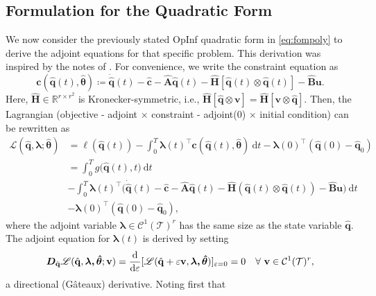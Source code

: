 \subsection*{Formulation for the Quadratic Form}

We now consider the previously stated OpInf quadratic form in \eqref{eq:fompoly} to derive the adjoint equations for that specific problem. This derivation was inspired by the notes of \cite{mcquarrie2024bayesian}. For convenience, we write the constraint equation as\\ 
$$\boldsymbol{c}(\hat{\mathbf{q}}(t),\hat{\bm{\theta}}) \coloneqq \dot{\hat{\mathbf{q}}}(t) - \hat{\mathbf{c}} - \hat{\mathbf{A}}\hat{\mathbf{q}}(t) - \hat{\mathbf{H}}[\hat{\mathbf{q}}(t)\otimes \hat{\mathbf{q}}(t)] - \hat{\mathbf{B}}\mathbf{u}.$$
Here, $\hat{\mathbf{H}}\in \mathbb{R}^{r\times r^2}$ is Kronecker-symmetric, i.e., $\hat{\mathbf{H}}[\hat{\mathbf{q}}\otimes \mathbf{v}] = \hat{\mathbf{H}}[\mathbf{v}\otimes \hat{\mathbf{q}}]$. Then, the Lagrangian (objective - adjoint $\times$ constraint - adjoint(0) $\times$ initial condition) can be rewritten as\\
\begin{align*}
    \mathscr{L}(\hat{\mathbf{q}}, \bm{\lambda}; \hat{\bm{\theta}}) &= \ell(\hat{\mathbf{q}}(t)) - \int_0^T \bm{\lambda}(t)^{\top}\boldsymbol{c}(\hat{\mathbf{q}}(t),\hat{\bm{\theta}})~\mathrm{d}t - \bm{\lambda}(0)^{\top}(\hat{\mathbf{q}}(0)-\hat{\mathbf{q}}_0)\\
    &= \int_0^T g\bigl(\hat{\mathbf{q}}(t),t \bigl)~\mathrm{d}t \\
    &- \int_0^T \bm{\lambda}(t)^{\top}\bigl(\dot{\hat{\mathbf{q}}}(t) - \hat{\mathbf{c}} - \hat{\mathbf{A}}\hat{\mathbf{q}}(t) - \hat{\mathbf{H}}(\hat{\mathbf{q}}(t)\otimes \hat{\mathbf{q}}(t)) - \hat{\mathbf{B}}\mathbf{u}\bigr)~\mathrm{d}t \\
    &-\bm{\lambda}(0)^{\top}(\hat{\mathbf{q}}(0)-\hat{\mathbf{q}}_0),
\end{align*}
where the adjoint variable $\bm{\lambda}\in\mathcal{C}^1(\mathcal{T})^r$ has the same size as the state variable $\hat{\mathbf{q}}$. The adjoint equation for $\bm{\lambda}(t)$ is derived by setting\\
$$ \bm{D}_{\hat{\mathbf{q}}} \mathscr{L}(\hat{\mathbf{q}},\bm{\lambda,\hat{\bm{\theta}}};\mathbf{v}) = \dv{}{\varepsilon}[\mathscr{L}(\hat{\mathbf{q}}+\varepsilon \mathbf{v},\bm{\lambda,\hat{\bm{\theta}}})]_{\varepsilon=0} = 0~~~\forall~\mathbf{v}\in\mathcal{C}^1(\mathcal{T})^r,$$a directional (Gâteaux) derivative. Noting first that\\
